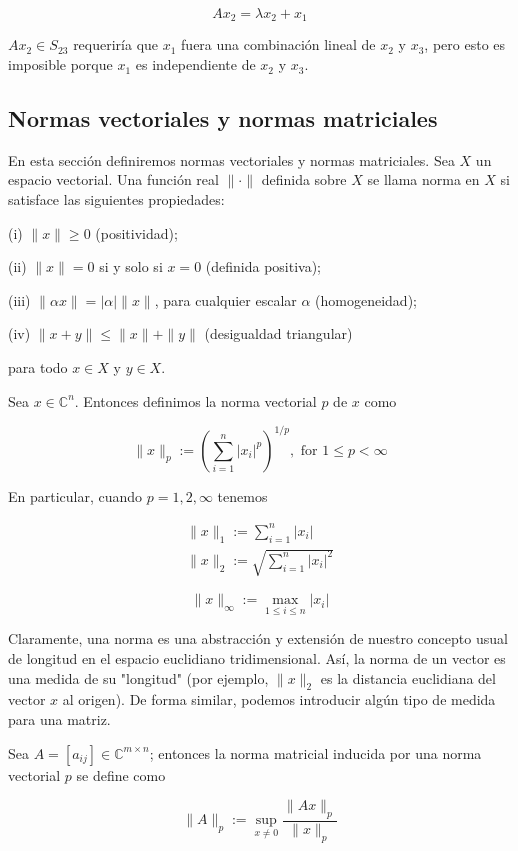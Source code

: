 \documentclass[11pt]{article}
\begin{document}
$$
A x_{2}=\lambda x_{2}+x_{1}
$$

$A x_{2} \in S_{23}$ requeriría que $x_{1}$ fuera una combinación lineal de $x_{2}$ y $x_{3}$, pero esto es imposible porque $x_{1}$ es independiente de $x_{2}$ y $x_{3}$.

\subsection*{Normas vectoriales y normas matriciales}
En esta sección definiremos normas vectoriales y normas matriciales. Sea $X$ un espacio vectorial. Una función real $\|\cdot\|$ definida sobre $X$ se llama norma en $X$ si satisface las siguientes propiedades:

(i) $\|x\| \geq 0$ (positividad);

(ii) $\|x\|=0$ si y solo si $x=0$ (definida positiva);

(iii) $\|\alpha x\|=|\alpha|\|x\|$, para cualquier escalar $\alpha$ (homogeneidad);

(iv) $\|x+y\| \leq\|x\|+\|y\|$ (desigualdad triangular)

para todo $x \in X$ y $y \in X$.

Sea $x \in \mathbb{C}^{n}$. Entonces definimos la norma vectorial $p$ de $x$ como

$$
\|x\|_{p}:=\left(\sum_{i=1}^{n}\left|x_{i}\right|^{p}\right)^{1 / p}, \text { for } 1 \leq p<\infty
$$

En particular, cuando $p=1,2, \infty$ tenemos

$$
\begin{gathered}
\|x\|_{1}:=\sum_{i=1}^{n}\left|x_{i}\right| \\
\|x\|_{2}:=\sqrt{\sum_{i=1}^{n}\left|x_{i}\right|^{2}}
\end{gathered}
$$

$$
\|x\|_{\infty}:=\max _{1 \leq i \leq n}\left|x_{i}\right|
$$

Claramente, una norma es una abstracción y extensión de nuestro concepto usual de longitud en el espacio euclidiano tridimensional. Así, la norma de un vector es una medida de su "longitud" (por ejemplo, $\|x\|_{2}$ es la distancia euclidiana del vector $x$ al origen). De forma similar, podemos introducir algún tipo de medida para una matriz.

Sea $A=\left[a_{i j}\right] \in \mathbb{C}^{m \times n}$; entonces la norma matricial inducida por una norma vectorial $p$ se define como

$$
\|A\|_{p}:=\sup _{x \neq 0} \frac{\|A x\|_{p}}{\|x\|_{p}}
$$
\end{document}
